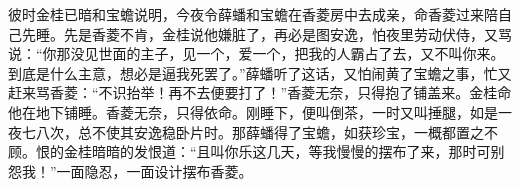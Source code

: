 \begin{parag}


    彼时金桂已暗和宝蟾说明，今夜令薛蟠和宝蟾在香菱房中去成亲，命香菱过来陪自己先睡。先是香菱不肯，金桂说他嫌脏了，再必是图安逸，怕夜里劳动伏侍，又骂说：“你那没见世面的主子，见一个，爱一个，把我的人霸占了去，又不叫你来。到底是什么主意，想必是逼我死罢了。”薛蟠听了这话，又怕闹黄了宝蟾之事，忙又赶来骂香菱：“不识抬举！再不去便要打了！”香菱无奈，只得抱了铺盖来。金桂命他在地下铺睡。香菱无奈，只得依命。刚睡下，便叫倒茶，一时又叫捶腿，如是一夜七八次，总不使其安逸稳卧片时。那薛蟠得了宝蟾，如获珍宝，一概都置之不顾。恨的金桂暗暗的发恨道：“且叫你乐这几天，等我慢慢的摆布了来，那时可别怨我！”一面隐忍，一面设计摆布香菱。
\end{parag}


\begin{parag}



\end{parag}
